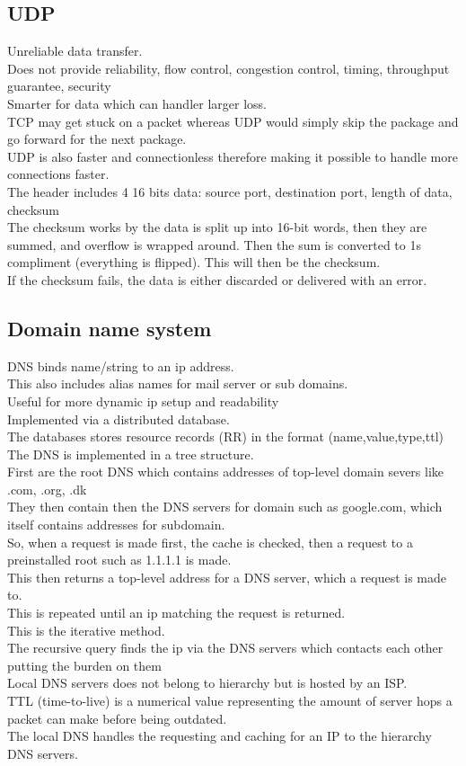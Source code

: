 \documentclass[12pt, a4paper]{article}
\begin{document}
		\subsection{UDP}
			Unreliable data transfer.\\
			Does not provide reliability, flow control, congestion control, timing, throughput guarantee, security\\
			Smarter for data which can handler larger loss. \\
			TCP may get stuck on a packet whereas UDP would simply skip the package and go forward for the next package.\\
			UDP is also faster and connectionless therefore making it possible to handle more connections faster.\\
			The header includes 4 16 bits data: source port, destination port, length of data, checksum\\
			The checksum works by the data is split up into 16-bit words, then they are summed, and overflow is wrapped around. Then the sum is converted to 1s compliment (everything is flipped). This will then be the checksum.\\
			If the checksum fails, the data is either discarded or delivered with an error.
		\subsection{Domain name system}
			DNS binds name/string to an ip address.\\
			This also includes alias names for mail server or sub domains.\\
			Useful for more dynamic ip setup and readability\\
			Implemented via a distributed database.\\
			The databases stores resource records (RR) in the format (name,value,type,ttl)\\
			The DNS is implemented in a tree structure.\\
			First are the root DNS which contains addresses of top-level domain severs like .com, .org, .dk\\
			They then contain then the DNS servers for domain such as google.com, which itself contains addresses for subdomain.\\
			So, when a request is made first, the cache is checked, then a request to a preinstalled root such as 1.1.1.1 is made.\\
			This then returns a top-level address for a DNS server, which a request is made to. \\
			This is repeated until an ip matching the request is returned.\\
			This is the iterative method.\\
			The recursive query finds the ip via the DNS servers which contacts each other putting the burden on them\\
			Local DNS servers does not belong to hierarchy but is hosted by an ISP.\\
			TTL (time-to-live) is a numerical value representing the amount of server hops a packet can make before being outdated.\\	
			The local DNS handles the requesting and caching for an IP to the hierarchy DNS servers.
\end{document}
